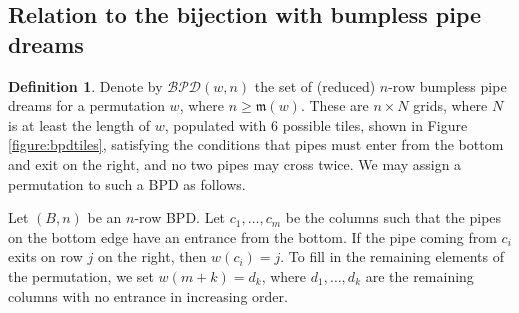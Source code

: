 \documentclass{amsart}
\newtheorem{theorem}{Theorem}[section]
\theoremstyle{definition}
\newtheorem{definition}[lemma]{Definition}
\theoremstyle{remark}
\numberwithin{equation}{subsection}
\DeclareMathOperator{\sch}{\mathfrak{S}}
\newcommand{\wof}[1]{w_{#1}}
\newcommand{\wtt}{\mathtt{wt}}
\newcommand{\coma}{\mathcal{A}}
\newcommand{\dcoma}{\mathcal{D}}
\newcommand{\maxd}{\mathfrak{m}}
\begin{document}

\subsection{Relation to the bijection with bumpless pipe dreams}

\newcommand{\BPD}{\mathcal{BPD}}


\begin{definition}
  Denote by $\BPD(w,n)$ the set of (reduced) $n$-row bumpless pipe dreams for a permutation $w$, where $n\geq \maxd(w)$. These are $n\times N$ grids, where $N$ is at least the length of $w$, populated with $6$ possible tiles, shown in Figure \ref{figure:bpdtiles}, satisfying the conditions that pipes must enter from the bottom and exit on the right, and no two pipes may cross twice. We may assign a permutation to such a BPD as follows.

  Let $(B, n)$ be an $n$-row BPD. Let $c_1,\ldots,c_m$ be the columns such that the pipes on the bottom edge have an entrance from the bottom. If the pipe coming from $c_i$ exits on row $j$ on the right, then $w(c_i) = j$. To fill in the remaining elements of the permutation, we set $w(m + k) = d_k$, where $d_1,\ldots,d_k$ are the remaining columns with no entrance in increasing order.

  

\end{definition}
\end{document}
